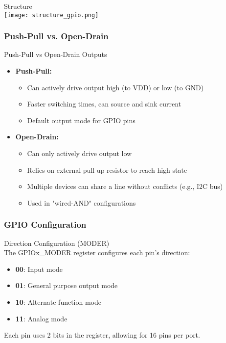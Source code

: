 \begin{concept}{Structure}\\
    \texttt{[image: structure\_gpio.png]}
\end{concept}



\subsubsection{Push-Pull vs. Open-Drain}

\begin{concept}{Push-Pull vs Open-Drain Outputs}
\begin{itemize}
    \item \textbf{Push-Pull:}
    \begin{itemize}
        \item Can actively drive output high (to VDD) or low (to GND)
        \item Faster switching times, can source and sink current
        \item Default output mode for GPIO pins
    \end{itemize}
    \item \textbf{Open-Drain:}
    \begin{itemize}
        \item Can only actively drive output low
        \item Relies on external pull-up resistor to reach high state
        \item Multiple devices can share a line without conflicts (e.g., I2C bus)
        \item Used in "wired-AND" configurations
    \end{itemize}
\end{itemize}
\end{concept}

\subsubsection{GPIO Configuration}

\begin{definition}{Direction Configuration (MODER)}\\
The GPIOx\_MODER register configures each pin's direction:
\begin{itemize}
    \item \textbf{00}: Input mode
    \item \textbf{01}: General purpose output mode
    \item \textbf{10}: Alternate function mode
    \item \textbf{11}: Analog mode
\end{itemize}
Each pin uses 2 bits in the register, allowing for 16 pins per port.
\end{definition}

